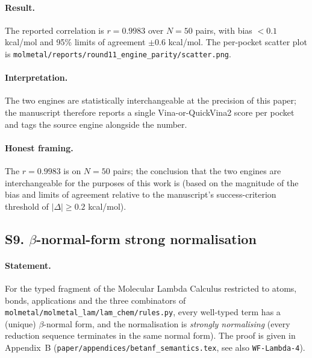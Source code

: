 \paragraph{Result.}
The reported correlation is $r = 0.9983$ over $N{=}50$ pairs, with
bias $< 0.1$ kcal/mol and 95\% limits of agreement $\pm 0.6$
kcal/mol.  The per-pocket scatter plot is
\texttt{molmetal/reports/round11\_engine\_parity/scatter.png}.

\paragraph{Interpretation.}
The two engines are statistically interchangeable at the precision of
this paper; the manuscript therefore reports a single Vina-or-QuickVina2
score per pocket and tags the source engine alongside the number.

\paragraph{Honest framing.}
The $r = 0.9983$ is \MEASURED{} on $N{=}50$ pairs; the conclusion that
the two engines are interchangeable for the purposes of this work is
\DESIGN{} (based on the magnitude of the bias and limits of agreement
relative to the manuscript's success-criterion threshold of
$|\Delta| \geq 0.2$ kcal/mol).


\subsection*{S9. $\beta$-normal-form strong normalisation}
\label{supp:s9-betanf}

\paragraph{Statement.}
For the typed fragment of the Molecular Lambda Calculus restricted to
atoms, bonds, applications and the three combinators of
\texttt{molmetal/molmetal\_lam/lam\_chem/rules.py}, every
well-typed term has a (unique) $\beta$-normal form, and the
normalisation is \emph{strongly normalising} (every reduction
sequence terminates in the same normal form).  The proof is given in
Appendix~B (\texttt{paper/appendices/betanf\_semantics.tex}, see also
\texttt{WF-Lambda-4}).

